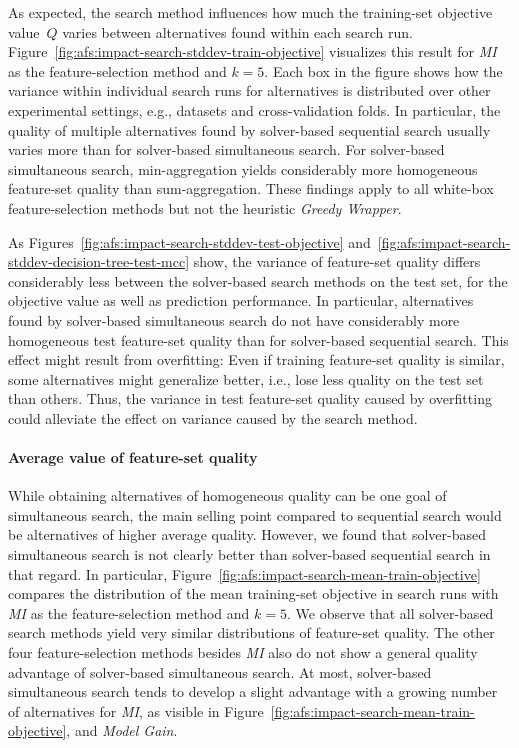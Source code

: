 \documentclass{article}
\theoremstyle{definition}
\begin{document}
As expected, the search method influences how much the training-set objective value~$Q$ varies between alternatives found within each search run.
Figure~\ref{fig:afs:impact-search-stddev-train-objective} visualizes this result for \emph{MI} as the feature-selection method and $k=5$.
Each box in the figure shows how the variance within individual search runs for alternatives is distributed over other experimental settings, e.g., datasets and cross-validation folds.
In particular, the quality of multiple alternatives found by solver-based sequential search usually varies more than for solver-based simultaneous search.
For solver-based simultaneous search, min-aggregation yields considerably more homogeneous feature-set quality than sum-aggregation.
These findings apply to all white-box feature-selection methods but not the heuristic \emph{Greedy Wrapper}.

As Figures~\ref{fig:afs:impact-search-stddev-test-objective} and~\ref{fig:afs:impact-search-stddev-decision-tree-test-mcc} show, the variance of feature-set quality differs considerably less between the solver-based search methods on the test set, for the objective value as well as prediction performance.
In particular, alternatives found by solver-based simultaneous search do not have considerably more homogeneous test feature-set quality than for solver-based sequential search.
This effect might result from overfitting:
Even if training feature-set quality is similar, some alternatives might generalize better, i.e., lose less quality on the test set than others.
Thus, the variance in test feature-set quality caused by overfitting could alleviate the effect on variance caused by the search method.

\paragraph{Average value of feature-set quality}

While obtaining alternatives of homogeneous quality can be one goal of simultaneous search, the main selling point compared to sequential search would be alternatives of higher average quality.
However, we found that solver-based simultaneous search is not clearly better than solver-based sequential search in that regard.
In particular, Figure~\ref{fig:afs:impact-search-mean-train-objective} compares the distribution of the mean training-set objective in search runs with \emph{MI} as the feature-selection method and $k=5$.
We observe that all solver-based search methods yield very similar distributions of feature-set quality.
The other four feature-selection methods besides \emph{MI} also do not show a general quality advantage of solver-based simultaneous search.
At most, solver-based simultaneous search tends to develop a slight advantage with a growing number of alternatives for \emph{MI}, as visible in Figure~\ref{fig:afs:impact-search-mean-train-objective}, and \emph{Model Gain}.
\end{document}
